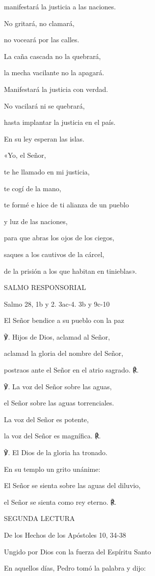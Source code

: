 {manifestará la justicia a las naciones.

No gritará, no clamará,

no voceará por las calles.

La caña cascada no la quebrará,

la mecha vacilante no la apagará.

Manifestará la justicia con verdad.

No vacilará ni se quebrará,

hasta implantar la justicia en el país.

En su ley esperan las islas.

«Yo, el Señor,

te he llamado en mi justicia,

te cogí de la mano,

te formé e hice de ti alianza de un pueblo

y luz de las naciones,

para que abras los ojos de los ciegos,

saques a los cautivos de la cárcel,

de la prisión a los que habitan en tinieblas».

SALMO RESPONSORIAL

Salmo 28, 1b y 2. 3ac-4. 3b y 9c-10

El Señor bendice a su pueblo con la paz

℣. Hijos de Dios, aclamad al Señor,

aclamad la gloria del nombre del Señor,

postraos ante el Señor en el atrio sagrado. ℟.

℣. La voz del Señor sobre las aguas,

el Señor sobre las aguas torrenciales.

La voz del Señor es potente,

la voz del Señor es magnífica. ℟.

℣. El Dios de la gloria ha tronado.

En su templo un grito unánime: 

El Señor se sienta sobre las aguas del diluvio,

el Señor se sienta como rey eterno. ℟.

SEGUNDA LECTURA

De los Hechos de los Apóstoles 10, 34-38

Ungido por Dios con la fuerza del Espíritu Santo

En aquellos días, Pedro tomó la palabra y dijo:

}
